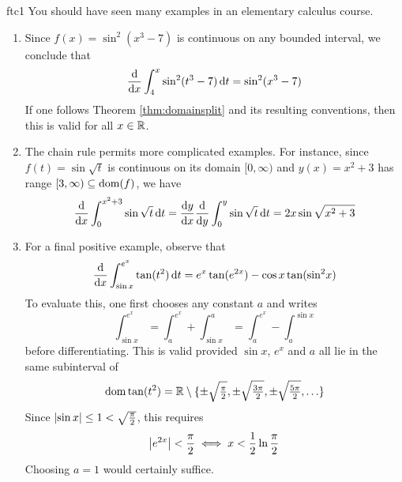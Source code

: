 \begin{examples}{}{ftc1}
You should have seen many examples in an elementary calculus course.
\begin{enumerate}
  \item Since $f(x)=\sin^2(x^3-7)$ is continuous on any bounded interval, we conclude that
  \[\displaystyle\diff x\int_4^x\sin^2(t^3-7)\,\dt=\sin^2(x^3-7)\]
  If one follows Theorem \ref{thm:domainsplit} and its resulting conventions, then this is valid for all $x\in\R$.
  
  \item The chain rule permits more complicated examples. For instance, since $f(t)=\sin\sqrt t$ is continuous on its domain $[0,\infty)$ and $y(x)=x^2+3$ has range $[3,\infty)\subseteq\dom(f)$, we have
  \[\diff x\int_0^{x^2+3}\sin\sqrt t\,\dt =\diff[y]{x}\diff y\int_0^{y}\sin\sqrt t\,\dt=2x\sin\sqrt{x^2+3}\]
  
  \item For a final positive example, observe that
  \[\displaystyle \diff x\int_{\sin x}^{e^x} \tan(t^2)\,\dt =e^x\tan(e^{2x}) -\cos x\tan(\sin^2\!x)\]
  To evaluate this, one first chooses any constant $a$ and writes
  \[\int_{\sin x}^{e^x} =\int_a^{e^x}+\int_{\sin x}^a =\int_a^{e^x}-\int_a^{\sin x}\]
  before differentiating. This is valid provided $\sin x$, $e^x$ and $a$ all lie in the same subinterval of
  \[\dom\tan(t^2)=\R\setminus\{\pm\sqrt{\tfrac\pi 2},\pm\sqrt{\tfrac{3\pi}2},\pm\sqrt{\tfrac{5\pi}2},\ldots\}\]
  Since $\nm{\sin x}\le 1<\sqrt{\frac\pi 2}$, this requires
  \[\nm{e^{2x}}<\frac\pi 2 \iff x<\frac 12\ln\frac\pi 2\]
  Choosing $a=1$ would certainly suffice.
  

\end{enumerate}
\end{examples}
